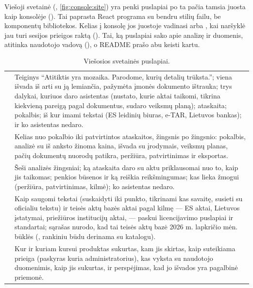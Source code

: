 Viešoji svetainė (, \cref{fig:console:site}) yra penki puslapiai po ta pačia tamsia
juosta kaip konsolėje (). Tai paprasta React programa su bendru stilių failu, be
komponentų bibliotekos. Kelias į konsolę jos juostoje vadinasi  arba
, kai naršyklė jau turi sesijos prieigos raktą (). Tai,
ką puslapiai sako apie analizę ir duomenis, atitinka naudotojo vadovą
(), o README prašo abu keisti kartu.

\begin{table}[H]
\caption{Viešosios svetainės puslapiai.}\label{tab:console:sitepages}
\begin{tabularx}{\textwidth}{@{}L{34mm}Y@{}}
\toprule
{} &  \\
\midrule
\code{/}  & Teiginys \enquote{Atitiktis yra
mozaika. Parodome, kurių detalių trūksta.}; viena išvada iš arti su ją lemiančia, pažymėta įmonės
dokumento ištrauka; trys dalykai, kuriuos daro asistentas (nustato, kurie aktai taikomi, tikrina
kiekvieną pareigą pagal dokumentus, sudaro veiksmų planą); ataskaita; pokalbis; iš kur imami
tekstai (ES leidinių biuras, e-TAR, Lietuvos bankas); ir ko asistentas nedaro. \\
  & Kelias nuo pokalbio iki patvirtintos ataskaitos, žingsnis po
žingsnio: pokalbis, analizė su iš anksto žinoma kaina, išvada su įrodymais, veiksmų planas,
pačių dokumentų nuorodų patikra, peržiūra, patvirtinimas ir eksportas. \\
  & Šeši analizės žingsniai; ką ataskaita daro su aktu priklausomai
nuo to, kaip jis taikomas; penkios būsenos ir ką reiškia reikšmingumas; kas lieka žmogui
(peržiūra, patvirtinimas, kilmė); ko asistentas nedaro. \\
  & Kaip saugomi tekstai (suskaidyti iki punkto, tikrinami kas
savaitę, susieti su oficialiu tekstu) ir teisės aktų bazės aktai pagal kilmę --- ES aktai, Lietuvos
įstatymai, priežiūros institucijų aktai, --- paskui licencijavimo puslapiai ir standartai; sąrašas
nurodo, kad tai teisės aktų bazė 2026 m. lapkričio mėn. būklės (, rankiniu būdu
derinama su katalogu). \\
  & Kur ir kuriam kursui produktas sukurtas, kam jis skirtas, kaip
suteikiama prieiga (paskyras kuria administratorius), kas vyksta su naudotojo duomenimis, kaip
jis sukurtas, ir perspėjimas, kad jo išvados yra pagalbinė priemonė. \\
\bottomrule
\end{tabularx}
\end{table}

